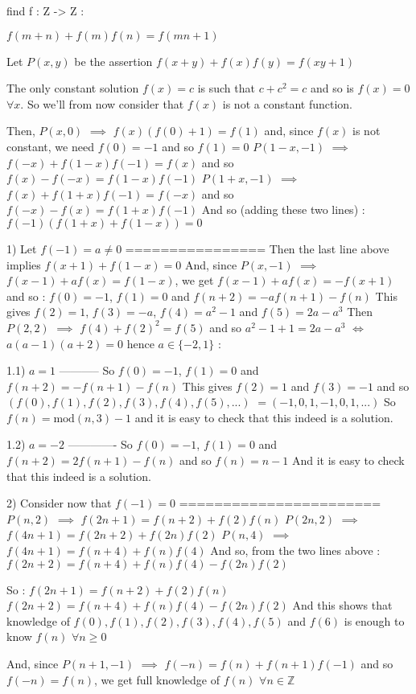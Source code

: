 \begin{solution}
	\begin{tcolorbox}find f : Z -> Z :

$ f(m + n) + f(m)f(n) = f(mn + 1 )$\end{tcolorbox}
Let $ P(x,y)$ be the assertion $ f(x+y)+f(x)f(y)=f(xy+1)$

The only constant solution $ f(x)=c$ is such that $ c+c^2=c$ and so is $ f(x)=0$ $ \forall x$. So we'll from now consider that $ f(x)$ is not a constant function.

Then, $ P(x,0)$ $ \implies$ $ f(x)(f(0)+1)=f(1)$ and, since $ f(x)$ is not constant, we need $ f(0)=-1$ and so $ f(1)=0$
$ P(1-x,-1)$ $ \implies$ $ f(-x)+f(1-x)f(-1)=f(x)$ and so $ f(x)-f(-x)=f(1-x)f(-1)$
$ P(1+x,-1)$ $ \implies$ $ f(x)+f(1+x)f(-1)=f(-x)$ and so $ f(-x)-f(x)=f(1+x)f(-1)$
And so (adding these two lines) : $ f(-1)(f(1+x)+f(1-x))=0$

1) Let $ f(-1)=a\ne 0$
================
Then the last line above implies $ f(x+1)+f(1-x)=0$
And, since $ P(x,-1)$ $ \implies$ $ f(x-1)+af(x)=f(1-x)$, we get $ f(x-1)+af(x)=-f(x+1)$ and so :
$ f(0)=-1$, $ f(1)=0$ and $ f(n+2)=-af(n+1)-f(n)$
This gives $ f(2)=1$, $ f(3)=-a$, $ f(4)=a^2-1$ and $ f(5)=2a-a^3$
Then $ P(2,2)$ $ \implies$ $ f(4)+f(2)^2=f(5)$ and so $ a^2-1+1=2a-a^3$ $ \iff$ $ a(a-1)(a+2)=0$ hence $ a\in\{-2,1\}$ :

1.1) $ a=1$
-----------
So $ f(0)=-1$, $ f(1)=0$ and $ f(n+2)=-f(n+1)-f(n)$
This gives $ f(2)=1$ and $ f(3)=-1$ and so $ (f(0),f(1),f(2),f(3),f(4),f(5),...)$ $ =(-1,0,1,-1,0,1, ...)$
So $ f(n)=\text{mod}(n,3)-1$ and it is easy to check that this indeed is a solution.

1.2) $ a=-2$
-------------
So $ f(0)=-1$, $ f(1)=0$ and $ f(n+2)=2f(n+1)-f(n)$ and so $ f(n)=n-1$
And it is easy to check that this indeed is a solution.

2) Consider now that $ f(-1)=0$
=======================
$ P(n,2)$ $ \implies$ $ f(2n+1)=f(n+2)+f(2)f(n)$
$ P(2n,2)$ $ \implies$ $ f(4n+1)=f(2n+2)+f(2n)f(2)$
$ P(n,4)$ $ \implies$ $ f(4n+1)=f(n+4)+f(n)f(4)$
And so, from the two lines above : $ f(2n+2)=f(n+4)+f(n)f(4)-f(2n)f(2)$

So :
$ f(2n+1)=f(n+2)+f(2)f(n)$
$ f(2n+2)=f(n+4)+f(n)f(4)-f(2n)f(2)$
And this shows that knowledge of $ f(0),f(1),f(2),f(3),f(4),f(5)$ and $ f(6)$ is enough to know $ f(n)$ $ \forall n\ge 0$

And, since $ P(n+1,-1)$ $ \implies$ $ f(-n)=f(n)+f(n+1)f(-1)$ and so $ f(-n)=f(n)$, we get full knowledge of $ f(n)$ $ \forall 
n\in\mathbb Z$


\end{solution}
